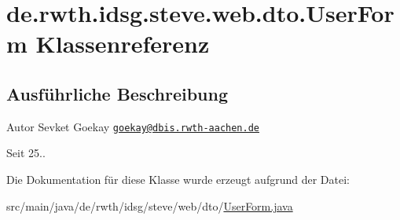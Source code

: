 \hypertarget{classde_1_1rwth_1_1idsg_1_1steve_1_1web_1_1dto_1_1_user_form}{\section{de.\+rwth.\+idsg.\+steve.\+web.\+dto.\+User\+Form Klassenreferenz}
\label{classde_1_1rwth_1_1idsg_1_1steve_1_1web_1_1dto_1_1_user_form}
}


\subsection{Ausführliche Beschreibung}
\begin{DoxyAuthor}{Autor}
Sevket Goekay \href{mailto:goekay@dbis.rwth-aachen.de}{\tt goekay@dbis.\+rwth-\/aachen.\+de} 
\end{DoxyAuthor}
\begin{DoxySince}{Seit}
25.. 
\end{DoxySince}


Die Dokumentation für diese Klasse wurde erzeugt aufgrund der Datei\+:\begin{DoxyCompactItemize}
\item 
src/main/java/de/rwth/idsg/steve/web/dto/\hyperlink{_user_form_8java}{User\+Form.\+java}\end{DoxyCompactItemize}
